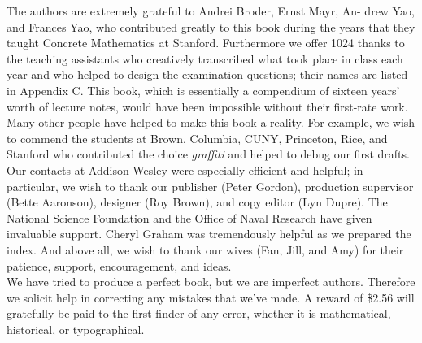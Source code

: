 \documentclass[a4paper]{article}
\begin{document}
\indent The authors are extremely grateful to Andrei Broder, Ernst Mayr, An-
drew Yao, and Frances Yao, who contributed greatly to this book during the
years that they taught Concrete Mathematics at Stanford. Furthermore we
offer 1024 thanks to the teaching assistants who creatively transcribed what
took place in class each year and who helped to design the examination questions; their names are listed in Appendix C. This book, which is essentially
a compendium of sixteen years' worth of lecture notes, would have been impossible without their first-rate work. \\
\indent Many other people have helped to make this book a reality. For example,
we wish to commend the students at Brown, Columbia, CUNY, Princeton,
Rice, and Stanford who contributed the choice \emph{graffiti} and helped to debug
our first drafts. Our contacts at Addison-Wesley were especially efficient
and helpful; in particular, we wish to thank our publisher (Peter Gordon),
production supervisor (Bette Aaronson), designer (Roy Brown), and copy editor (Lyn Dupre). The National Science Foundation and the Office of Naval
Research have given invaluable support. Cheryl Graham was tremendously
helpful as we prepared the index. And above all, we wish to thank our wives
(Fan, Jill, and Amy) for their patience, support, encouragement, and ideas.\\
\indent We have tried to produce a perfect book, but we are imperfect authors.
Therefore we solicit help in correcting any mistakes that we've made. A reward of \$2.56 will gratefully be paid to the first finder of any error, whether
it is mathematical, historical, or typographical.
\end{document}
